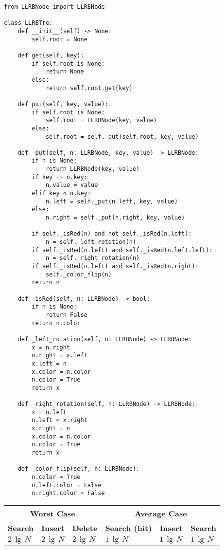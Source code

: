 \documentclass[a4paper]{article}
\begin{document}
\begin{lstlisting}
from LLRBNode import LLRBNode

class LLRBTre:
    def __init__(self) -> None:
        self.root = None

    def get(self, key):
        if self.root is None:
            return None
        else:
            return self.root.get(key)

    def put(self, key, value):
        if self.root is None:
            self.root = LLRBNode(key, value)
        else:
            self.root = self._put(self.root, key, value)

    def _put(self, n: LLRBNode, key, value) -> LLRBNode:
        if n is None:
            return LLRBNode(key, value)
        if key == n.key:
            n.value = value
        elif key < n.key:
            n.left = self._put(n.left, key, value)
        else:
            n.right = self._put(n.right, key, value)

        if self._isRed(n) and not self._isRed(n.left):
            n = self._left_rotation(n)
        if self._isRed(n.left) and self._isRed(n.left.left):
            n = self._right_rotation(n)
        if self._isRed(n.left) and self._isRed(n.right):
            self._color_flip(n)
        return n

    def _isRed(self, n: LLRBNode) -> bool:
        if n is None:
            return False
        return n.color

    def _left_rotation(self, n: LLRBNode) -> LLRBNode:
        x = n.right
        n.right = x.left
        x.left = n
        x.color = n.color
        n.color = True
        return x

    def _right_rotation(self, n: LLRBNode) -> LLRBNode:
        x = n.left
        n.left = x.right
        x.right = n
        x.color = n.color
        n.color = True
        return x

    def _color_flip(self, n: LLRBNode):
        n.color = True
        n.left.color = False
        n.right.color = False
\end{lstlisting}
\begin{spacing}{1.5}
\begin{tabularx}{1\textwidth}{|X|X|X|X|X|X|}
    \hline
    \multicolumn{3}{|c|}{\textbf{Worst Case}} &\multicolumn{3}{c|}{\textbf{Average Case}}\\
    \hline
    \textbf{Search} & \textbf{Insert} & \textbf{Delete} & \textbf{Search (hit)} & \textbf{Insert} & \textbf{Search}\\
    \hline
    $2\,\lg\,N$&$2\,\lg\,N$&$2\,\lg\,N$&$1\,\lg\,N$&$1\,\lg\,N$&$1\,\lg\,N$\\
    \hline
\end{tabularx}
\end{spacing}
\end{document}
